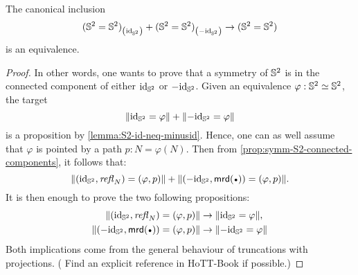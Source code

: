 \documentclass[english,a4]{article}
\begin{document}
\begin{proposition}
  The canonical inclusion
  \begin{displaymath}
    {({{\mathbb S^{2}}}= {{\mathbb S^{2}}})}_{\left(\mathord{\mathrm{id}}_{{\mathbb S^{2}}}\right)} + {({{\mathbb S^{2}}} = {{\mathbb S^{2}}})}_{\left(-\mathord{\mathrm{id}}_{{\mathbb S^{2}}}\right)} \to ({{\mathbb S^{2}}} = {{\mathbb S^{2}}})
  \end{displaymath}
  is an equivalence.
  \label{prop:symm-S2-connected-components}
\end{proposition}
\begin{proof}
  In other words, one wants to prove that a symmetry of ${{\mathbb S^{2}}}$ is in the
  connected component of either $\mathord{\mathrm{id}}_{{\mathbb S^{2}}}$ or $-\mathord{\mathrm{id}}_{{\mathbb S^{2}}}$. Given an equivalence
  $\varphi:{{\mathbb S^{2}}} \simeq {{\mathbb S^{2}}}$, the target 
  \begin{displaymath}
    \lVert\mathord{\mathrm{id}}_{{\mathbb S^{2}}} = \varphi\rVert + \lVert-\mathord{\mathrm{id}}_{{\mathbb S^{2}}} = \varphi\rVert
  \end{displaymath}
  is a proposition by \cref{lemma:S2-id-neq-minusid}. Hence, one can as well
  assume that $\varphi$ is pointed by a path $p:N=\varphi(N)$. Then from
  \cref{prop:symm-S2-connected-components}, it follows that:
  \begin{displaymath}
    \Trunc{(\id_\Sp,\refl N) = (\varphi, p)} + \Trunc{(-\id_\Sp,\mrd(\base)) = (\varphi, p)}.
  \end{displaymath}
  It is then enough to prove the two following propositions:
  \begin{align*}
    \Trunc{(\id_\Sp,\refl N) = (\varphi, p)} &\to \Trunc{\id_\Sp = \varphi},
    \\
    \Trunc{(-\id_\Sp,\mrd(\base)) = (\varphi, p)} &\to \Trunc{-\id_\Sp = \varphi}
  \end{align*}
  Both implications come from the general behaviour of truncations with
  projections. ({\color{red} Find an explicit reference in HoTT-Book if
  possible.})
\end{proof}
\end{document}
